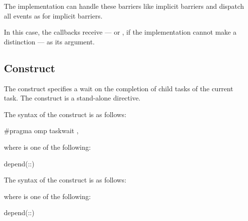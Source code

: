 The implementation can handle these barriers like implicit barriers and
dispatch all events as for implicit barriers. 

In this case, the callbacks receive
 --- or
, if the implementation cannot make a
distinction --- as its  argument.





\subsection{ Construct}
\label{subsec:taskwait Construct}
\summary
The  construct specifies a wait on the completion of child tasks
of the current task. The  construct is a stand-alone directive.

\syntax
\begin{ccppspecific}
The syntax of the  construct is as follows:

\begin{ompcPragma}
#pragma omp taskwait \plc{[clause[ [},\plc{] clause] ... ] new-line}
\end{ompcPragma}

where  is one of the following:

\begin{indentedcodelist}
depend(\plc{[depend-modifier}:\plc{]dependence-type }:)
\end{indentedcodelist}
\end{ccppspecific}

\begin{fortranspecific}
The syntax of the  construct is as follows:


where  is one of the following:

\begin{indentedcodelist}
depend(\plc{[depend-modifier}:\plc{]dependence-type }:)
\end{indentedcodelist}

\end{fortranspecific}

